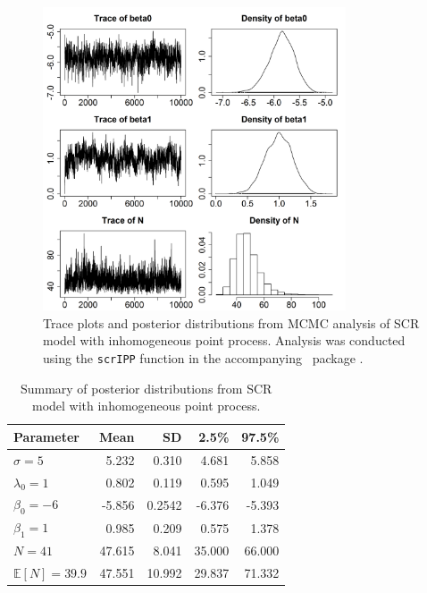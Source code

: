 \begin{figure}
  \centering
  \includegraphics[width=0.8\textwidth]{Ch11/figs/fm1p}
  \caption{Trace plots and posterior distributions from MCMC analysis
    of SCR model with inhomogeneous point process. Analysis was
    conducted using the \texttt{scrIPP} function in the accompanying
    \R~package \scrbook.}
  \label{state-space.fig.fm1post}
\end{figure}

\begin{table}%
\centering
\caption{Summary of posterior distributions from SCR model with
  inhomogeneous point process. }
\begin{tabular}{lrrrr}
\hline
Parameter 	 	& Mean  	& SD    	& 2.5\% 	& 97.5\% \\
\hline
 $\sigma=5$ 	 	&  5.232 	&  0.310 	&  4.681 	&  5.858 \\
 $\lambda_0=1$ 	 	&  0.802 	&  0.119 	&  0.595 	&  1.049 \\
 $\beta_0=-6$ 	 	& -5.856        & 0.2542        & -6.376        & -5.393 \\
 $\beta_1=1$ 	 	&  0.985 	&  0.209 	&  0.575 	&  1.378 \\
 $N=41$ 	 	& 47.615 	&  8.041 	& 35.000 	& 66.000 \\
 $\mathbb{E}[N]=39.9$ 	& 47.551 	& 10.992 	& 29.837 	& 71.332 \\
\hline
\end{tabular}
\label{state-space.tab.simIPP}
\end{table}

